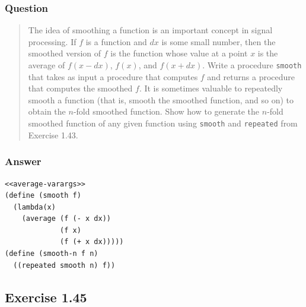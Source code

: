 \documentclass[final,fleqn,titlepage,twoside]{article}
\begin{document}
\subsubsection{Question}
\label{sec:orgba6fee8}
\begin{quote}
The idea of smoothing a function is an important concept in signal processing.
If \(f\) is a function and \(dx\) is some small number, then the smoothed
version of \(f\) is the function whose value at a point \(x\) is the average of
\(f(x - dx)\), \(f(x)\), and \(f(x + dx)\). Write a procedure \texttt{smooth}
that takes as input a procedure that computes \(f\) and returns a procedure that
computes the smoothed \(f\). It is sometimes valuable to repeatedly smooth a
function (that is, smooth the smoothed function, and so on) to obtain the
\(n\)-fold smoothed function. Show how to generate the \(n\)-fold smoothed
function of any given function using \texttt{smooth} and \texttt{repeated}
from Exercise 1.43.
\end{quote}

\subsubsection{Answer}
\label{sec:org477ea38}
\begin{verbatim}
<<average-varargs>>
(define (smooth f)
  (lambda(x)
    (average (f (- x dx))
             (f x)
             (f (+ x dx)))))
(define (smooth-n f n)
  ((repeated smooth n) f))
\end{verbatim}

\subsection{Exercise 1.45}
\label{sec:orga0d2834}
\end{document}

